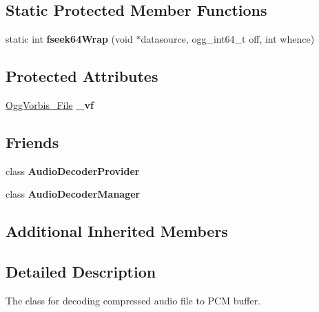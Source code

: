 \subsection*{Static Protected Member Functions}
\begin{DoxyCompactItemize}
\item 
\mbox{\label{classcocos2d_1_1experimental_1_1AudioDecoderOgg_a5634163b95dc65c915b648e767ea49f3}} 
static int {\bfseries fseek64\+Wrap} (void $\ast$datasource, ogg\+\_\+int64\+\_\+t off, int whence)
\end{DoxyCompactItemize}
\subsection*{Protected Attributes}
\begin{DoxyCompactItemize}
\item 
\mbox{\label{classcocos2d_1_1experimental_1_1AudioDecoderOgg_a30591a019b5271498d89603bc687e266}} 
\hyperlink{structOggVorbis__File}{Ogg\+Vorbis\+\_\+\+File} {\bfseries \+\_\+vf}
\end{DoxyCompactItemize}
\subsection*{Friends}
\begin{DoxyCompactItemize}
\item 
\mbox{\label{classcocos2d_1_1experimental_1_1AudioDecoderOgg_afb46984384ce8b9caa8516e0a84944ef}} 
class {\bfseries Audio\+Decoder\+Provider}
\item 
\mbox{\label{classcocos2d_1_1experimental_1_1AudioDecoderOgg_af7bd9270f880d1dc12f5f54d21b08711}} 
class {\bfseries Audio\+Decoder\+Manager}
\end{DoxyCompactItemize}
\subsection*{Additional Inherited Members}


\subsection{Detailed Description}
The class for decoding compressed audio file to P\+CM buffer. 

